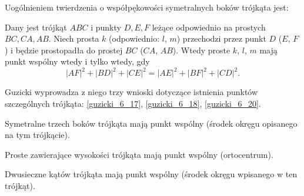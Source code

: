 %

Uogólnieniem twierdzenia o współpękowości symetralnych boków trójkąta jest:

\begin{proposition}
\label{guzicki_6_13}%
	Dany jest trójkąt $ABC$ i punkty $D, E, F$ leżące odpowiednio na prostych $BC, CA, AB$.
	Niech prosta $k$ (odpowiednio: $l$, $m$) przechodzi przez punkt $D$ ($E$, $F$) i będzie prostopadła do prostej $BC$ ($CA$, $AB$).
	Wtedy proste $k$, $l$, $m$ mają punkt wspólny wtedy i tylko wtedy, gdy
	\begin{equation}
		|AF|^2 + |BD|^2 + |CE|^2 = |AE|^2 + |BF|^2 + |CD|^2.
	\end{equation}
\end{proposition}

Guzicki \cite[s. 176]{guzicki_2021} wyprowadza z niego trzy wnioski dotyczące istnienia punktów szczególnych trójkąta: \ref{guzicki_6_17}, \ref{guzicki_6_18}, \ref{guzicki_6_20}.

\begin{corollary}
\label{guzicki_6_17}%
    Symetralne trzech boków trójkąta mają punkt wspólny (środek okręgu opisanego na tym trójkącie).
\end{corollary}

\begin{corollary}
\label{guzicki_6_18}%
    Proste zawierające wysokości trójkąta mają punkt wspólny (ortocentrum).
%
\end{corollary}

\begin{corollary}
\label{guzicki_6_20}%
    Dwusieczne kątów trójkąta mają punkt wspólny (środek okręgu wpisanego w ten trójkąt).
\end{corollary}

%